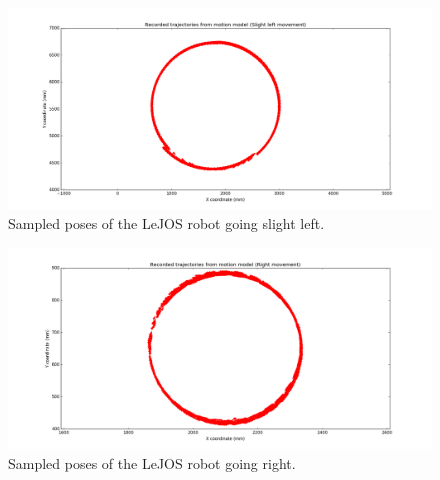 \documentclass[paper=a4, fontsize=11pt]{scrartcl} %
\begin{document}
    \begin{figure}[h!]
        \begin{center}
            \setlength{\fboxsep}{0.5pt} %
            \setlength{\fboxrule}{0.5pt}
            \includegraphics[width=\linewidth,fbox]{images/raw_slightLeft.png}
            \caption{Sampled poses of the LeJOS robot going slight left.}
        \end{center}
    \end{figure}
    
    \begin{figure}[h!]
        \begin{center}
            \setlength{\fboxsep}{0.5pt} %
            \setlength{\fboxrule}{0.5pt}
            \includegraphics[width=\linewidth,fbox]{images/raw_right.png}
            \caption{Sampled poses of the LeJOS robot going right.}
        \end{center}
    \end{figure}
    
\end{document}
